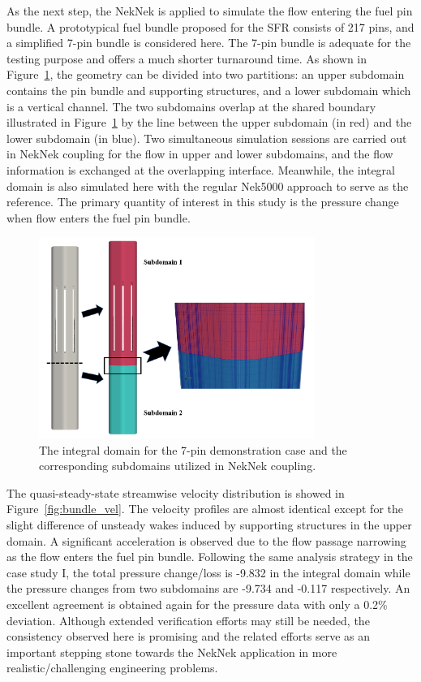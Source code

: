 As the next step, the NekNek is applied to simulate the flow entering the fuel pin bundle. A prototypical fuel bundle proposed for the SFR consists of 217 pins, and a simplified 7-pin bundle is considered here. The 7-pin bundle is adequate for the testing purpose and offers a much shorter turnaround time. 
As shown in Figure~\ref{fig:bundle_domain}, the geometry can be divided into two partitions: an upper subdomain contains the pin bundle and supporting structures, and a lower subdomain which is a vertical channel. 
The two subdomains overlap at the shared boundary illustrated in Figure~\ref{fig:bundle_domain} by the line between the upper subdomain (in red) and the lower subdomain (in blue). Two simultaneous simulation sessions are carried out in NekNek coupling for the flow in upper and lower subdomains, and the flow information is exchanged at the overlapping interface. Meanwhile, the integral domain is also simulated here with the regular Nek5000 approach to serve as the reference. The primary quantity of interest in this study is the pressure change when flow enters the fuel pin bundle. 

\begin{figure}[!ht]
\centering
\includegraphics[width=0.8\textwidth]{./figures/bundle_neknek_domain.png}
\caption{The integral domain for the 7-pin demonstration case and the corresponding subdomains utilized in NekNek coupling. }
\label{fig:bundle_domain}
\end{figure}

The quasi-steady-state streamwise velocity distribution is showed in Figure~\ref{fig:bundle_vel}. 
The velocity profiles are almost identical except for the slight difference of unsteady wakes induced by supporting structures in the upper domain. A significant acceleration is observed due to the flow passage narrowing as the flow enters the fuel pin bundle. Following the same analysis strategy in the case study I, the total pressure change/loss is -9.832 in the integral domain while the pressure changes from two subdomains are -9.734 and -0.117 respectively. 
An excellent agreement is obtained again for the pressure data with only a 0.2\% deviation. Although extended verification efforts may still be needed, the consistency observed here is promising and the related efforts serve as an important stepping stone towards the NekNek application in more realistic/challenging engineering problems. 

